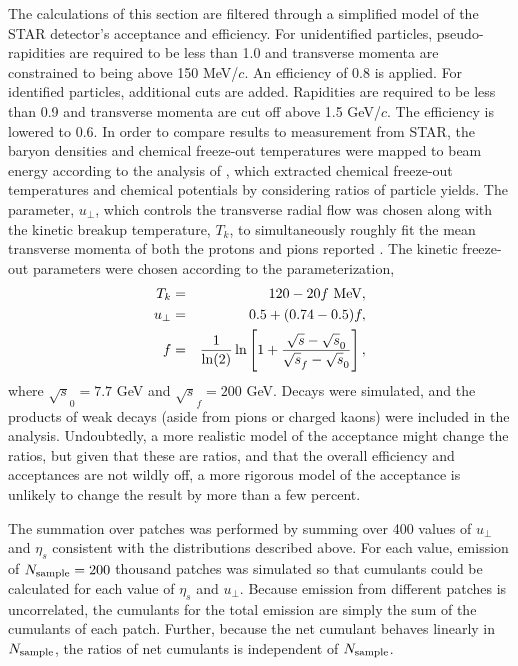 The calculations of this section are filtered through a simplified model of the STAR detector's acceptance and efficiency. For unidentified particles, pseudo-rapidities are required to be less than 1.0 and transverse momenta are constrained to being above 150 MeV/$c$. An efficiency of 0.8 is applied. For identified particles, additional cuts are added. Rapidities are required to be less than 0.9 and transverse momenta are cut off above 1.5 GeV/$c$. The efficiency is lowered to 0.6. In order to compare results to measurement from STAR, the baryon densities and chemical freeze-out temperatures were mapped to beam energy according to the analysis of \cite{Kumar:2012np}, which extracted chemical freeze-out temperatures and chemical potentials by considering ratios of particle yields. The parameter, $u_\perp$, which controls the transverse radial flow was chosen along with the kinetic breakup temperature, $T_k$, to simultaneously roughly fit the mean transverse momenta of both the protons and pions reported \cite{Abelev:2009bw}. The kinetic freeze-out parameters were chosen according to the parameterization,
\begin{eqnarray}
T_k&=&120-20f~{\rm MeV},\\
u_\perp&=&0.5+(0.74-0.5)f,\\
f&=&\frac{1}{\ln(2)}
\ln\left[ 1+ \frac{\sqrt{s}-\sqrt{s}_0}{\sqrt{s}_f-\sqrt{s}_0}\right],
\end{eqnarray}
where $\sqrt{s}_0=7.7$ GeV and $\sqrt{s}_f=200$ GeV. Decays were simulated, and the products of weak decays (aside from pions or charged kaons) were included in the analysis. Undoubtedly, a more realistic model of the acceptance might change the ratios, but given that these are ratios, and that the overall efficiency and acceptances are not wildly off, a more rigorous model of the acceptance is unlikely to change the result by more than a few percent.

The summation over patches was performed by summing over 400 values of $u_\perp$ and $\eta_s$ consistent with the distributions described above. For each value, emission of $N_{\rm sample}=200$ thousand patches was simulated so that cumulants could be calculated for each value of $\eta_s$ and $u_\perp$. Because emission from different patches is uncorrelated, the cumulants for the total emission are simply the sum of the cumulants of each patch. Further, because the net cumulant behaves linearly in $N_{\rm sample}$, the ratios of net cumulants is independent of $N_{\rm sample}$.

